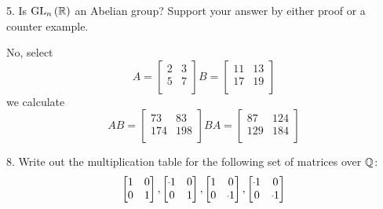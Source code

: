 \newpage
\begin{mdframed}[style=darkQuesion]
5. Is $\mathrm{GL}_{n}\left(\mathbb{R}\right)$ an Abelian group? Support your answer by either proof or a
counter example.
\end{mdframed}

\begin{mdframed}[style=darkAnswer,frametitle={Joe Starr}]
No, select $$A=\begin{bmatrix}
  2 & 3 \\
  5 & 7 \\
  \end{bmatrix}
  B=\begin{bmatrix}
  11 & 13 \\
  17 & 19 \\
  \end{bmatrix}$$
we calculate
$$AB=\begin{bmatrix}
  73  & 83  \\
  174 & 198 \\
  \end{bmatrix}
  BA=\begin{bmatrix}
  87  & 124 \\
  129 & 184 \\
  \end{bmatrix}$$
\end{mdframed}
\newpage
\begin{mdframed}[style=darkQuesion]
8. Write out the multiplication table for the following set of matrices over
$\mathbb{Q}$:
$$\begin{bmatrix}
  1 & 0 \\
  0 & 1 \\
  \end{bmatrix},
  \begin{bmatrix}
  \m1 & 0 \\
  0   & 1 \\
  \end{bmatrix},
  \begin{bmatrix}
  1 & 0   \\
  0 & \m1 \\
  \end{bmatrix},
  \begin{bmatrix}
  \m1 & 0   \\
  0   & \m1 \\
  \end{bmatrix}$$


\end{mdframed}

